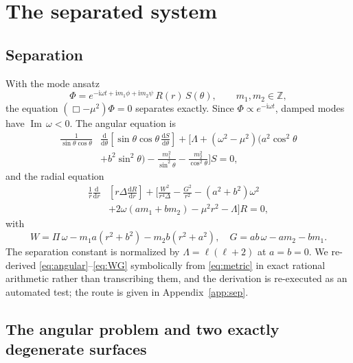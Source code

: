 \documentclass[aps,prd,reprint,superscriptaddress,nofootinbib,longbibliography]{revtex4-2}
\theoremstyle{plain}
\theoremstyle{definition}
\theoremstyle{remark}
\newcommand{\Imm}{\operatorname{Im}}
\newcommand{\dd}{\mathrm{d}}
\newcommand{\ii}{\mathrm{i}}
\begin{document}
\section{The separated system}\label{sec:separated}

\subsection{Separation}\label{sec:sep:separation}

With the mode ansatz
\begin{equation}\label{eq:modeansatz}
  \Phi = e^{-\ii\omega t + \ii m_1\phi + \ii m_2\psi}\,R(r)\,S(\theta),
  \qquad m_1,m_2\in\mathbb{Z},
\end{equation}
the equation $(\Box-\mu^2)\Phi=0$ separates exactly. Since
$\Phi\propto e^{-\ii\omega t}$, damped modes have $\Imm\,\omega<0$. The angular
equation is
\begin{align}\label{eq:angular}
  \frac{1}{\sin\theta\cos\theta}&\frac{\dd}{\dd\theta}
  \left[\sin\theta\cos\theta\,\frac{\dd S}{\dd\theta}\right]
  + \Big[\Lambda + (\omega^2-\mu^2)\big(a^2\cos^2\!\theta \nonumber\\
  &+b^2\sin^2\!\theta\big)
    - \frac{m_1^2}{\sin^2\!\theta} - \frac{m_2^2}{\cos^2\!\theta}\Big]S = 0 ,
\end{align}
and the radial equation
\begin{align}\label{eq:radial}
  \frac{1}{r}\frac{\dd}{\dd r}&\!\left[r\Delta\frac{\dd R}{\dd r}\right]
  + \Big[\frac{W^2}{r^4\Delta} - \frac{G^2}{r^2} - (a^2+b^2)\omega^2 \nonumber\\
  &+ 2\omega(am_1+bm_2) - \mu^2r^2 - \Lambda\Big]R = 0 ,
\end{align}
with
\begin{equation}\label{eq:WG}
  W = \Pi\,\omega - m_1a(r^2+b^2) - m_2b(r^2+a^2),\quad
  G = ab\,\omega - am_2 - bm_1 .
\end{equation}
The separation constant is normalized by $\Lambda=\ell(\ell+2)$ at $a=b=0$. We
re-derived \eqref{eq:angular}--\eqref{eq:WG} symbolically from
\eqref{eq:metric} in exact rational arithmetic rather than transcribing them,
and the derivation is re-executed as an automated test; the route is given in
Appendix~\ref{app:sep}.

\subsection{The angular problem and two exactly degenerate surfaces}
\label{sec:sep:angular}
\end{document}
